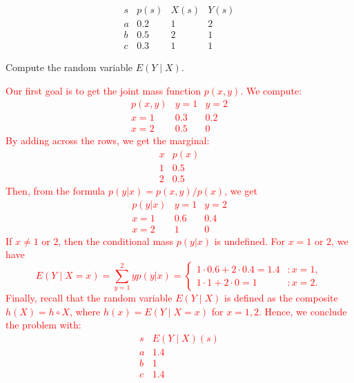 \documentclass[12pt,reqno]{amsart}
\begin{document}
	\[
	\begin{array}{c|ccc}
	s & p(s) & X(s) & Y(s) \\ \hline
	a & 0.2 & 1 & 2 \\
	b & 0.5 & 2 & 1 \\
	c & 0.3 & 1 & 1
	\end{array}
	\] 

Compute the random variable $E(Y \mid X)$.

\bigskip
\textcolor{red}{Our first goal is to get the joint mass function $p(x,y)$. We compute:
	\[
	\begin{array}{c|cc}
	p(x,y) & y=1 & y=2 \\ \hline
	x=1 & 0.3 & 0.2 \\
	x=2 & 0.5 & 0
	\end{array}
	\]
By adding across the rows, we get the marginal:
	\[\begin{array}{c|c}
	x & p(x) \\ \hline
	1 & 0.5 \\
	2 & 0.5
	\end{array}
	\]
Then, from the formula $p(y|x) = p(x,y)/p(x)$, we get
	\[
	\begin{array}{c|cc}
	p(y|x) & y=1 & y=2 \\ \hline
	x=1 & 0.6 & 0.4 \\
	x=2 & 1 & 0
	\end{array}
	\]
If $x\neq 1$ or $2$, then the conditional mass $p(y|x)$ is undefined. For $x=1$ or $2$, we have
	\[E(Y \mid X=x) = \sum_{y=1}^2 y p(y|x) =  \begin{cases} 1 \cdot 0.6 + 2\cdot 0.4 = 1.4 & : x=1, \\
	1\cdot 1 + 2 \cdot 0 = 1 & : x=2.
	\end{cases}
	\]
Finally, recall that the random variable $E(Y\mid X)$ is defined as the composite $h(X) = h \circ X$, where $h(x) = E(Y \mid X=x)$ for $x=1,2$. Hence, we conclude the problem with:
	\[
	\begin{array}{c|c}
	s & E(Y\mid X)(s) \\ \hline
	a & 1.4 \\
	b & 1 \\
	c & 1.4
	\end{array}
	\] }
\bigskip
\end{document}
